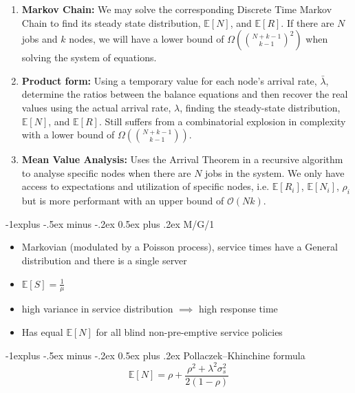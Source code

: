 \documentclass[a4paper]{article}
\makeatletter
\renewcommand{\subsection}{\@startsection{subsection}{2}{0mm}%
                                {-1explus -.5ex minus -.2ex}%
                                {0.5ex plus .2ex}%
                                {\normalfont\normalsize\bfseries}}
\makeatother
\begin{document}
\begin{multicols*}{3}
\begin{enumerate}
    \item \textbf{Markov Chain:} We may solve the corresponding Discrete Time Markov Chain to find its steady state distribution, $\mathbb{E}[N]$, and $\mathbb{E}[R]$. If there are $N$ jobs and $k$ nodes, we will have a lower bound of $\Omega(\binom{N+k-1}{k-1}^2)$ when solving the system of equations.
    \item \textbf{Product form:} Using a temporary value for each node's arrival rate, $\bar \lambda$, determine the ratios between the balance equations and then recover the real values using the actual arrival rate, $\lambda$, finding the steady-state distribution, $\mathbb{E}[N]$, and $\mathbb{E}[R]$. Still suffers from a combinatorial explosion in complexity with a lower bound of $\Omega(\binom{N+k-1}{k-1})$.
    \item \textbf{Mean Value Analysis:} Uses the Arrival Theorem in a recursive algorithm to analyse specific nodes when there are $N$ jobs in the system. We only have access to expectations and utilization of specific nodes, i.e. $\mathbb{E}[R_i]$, $\mathbb{E}[N_i]$, $\rho_i$ but is more performant with an upper bound of $\mathcal{O}(Nk)$. 
\end{enumerate}

\subsection{M/G/1}

\begin{itemize}
    \item Markovian (modulated by a Poisson process), service times have a General distribution and there is a single server
    \item $\mathbb{E}[S] = \frac{1}{\mu}$
    \item high variance in service distribution $\implies$ high response time
    \item Has equal $\mathbb{E}[N]$ for all blind non-pre-emptive service policies
\end{itemize}

\subsection{Pollaczek–Khinchine formula}
\[
 \mathbb{E}[N] = \rho + \frac{\rho^2 + \lambda^2 \sigma_s^2}{2(1-\rho)}
\]


\end{multicols*}
\end{document}
